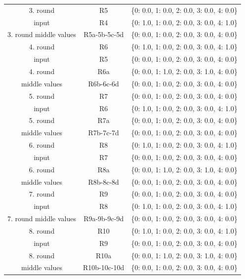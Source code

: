\documentclass [version=final]{iacrcc}
\begin{document}
\begin{table}[ht]
\begin{tabular}{|c|c|c|}
        \hline
        3. round  & R5 & \{0: 0.0, 1: 0.0, 2: 0.0, 3: 0.0, 4: 0.0\} \\
        input     & R4 & \{0: 1.0, 1: 0.0, 2: 0.0, 3: 0.0, 4: 1.0\} \\
        \hline
        3. round middle values     & R5a-5b-5c-5d & \{0: 0.0, 1: 0.0, 2: 0.0, 3: 0.0, 4: 0.0\} \\
        \hline
        4. round  & R6 & \{0: 1.0, 1: 0.0, 2: 0.0, 3: 0.0, 4: 1.0\} \\
        input     & R5 & \{0: 0.0, 1: 0.0, 2: 0.0, 3: 0.0, 4: 0.0\} \\
        \hline
        4. round  & R6a & \{0: 0.0, 1: 1.0, 2: 0.0, 3: 1.0, 4: 0.0\} \\
        middle values & R6b-6c-6d & \{0: 0.0, 1: 0.0, 2: 0.0, 3: 0.0, 4: 0.0\} \\
                              \hline
        5. round  & R7 & \{0: 0.0, 1: 0.0, 2: 0.0, 3: 0.0, 4: 0.0\} \\
        input     & R6 & \{0: 1.0, 1: 0.0, 2: 0.0, 3: 0.0, 4: 1.0\} \\
        \hline
        5. round  & R7a & \{0: 0.0, 1: 0.0, 2: 0.0, 3: 0.0, 4: 0.0\} \\
        middle values & R7b-7c-7d & \{0: 0.0, 1: 0.0, 2: 0.0, 3: 0.0, 4: 0.0\} \\
                      
        \hline
        6. round  & R8 & \{0: 1.0, 1: 0.0, 2: 0.0, 3: 0.0, 4: 1.0\} \\
        input     & R7 & \{0: 0.0, 1: 0.0, 2: 0.0, 3: 0.0, 4: 0.0\} \\
        \hline
        6. round  & R8a & \{0: 0.0, 1: 1.0, 2: 0.0, 3: 1.0, 4: 0.0\} \\
        middle values & R8b-8c-8d & \{0: 0.0, 1: 0.0, 2: 0.0, 3: 0.0, 4: 0.0\} \\
                     
        \hline
        7. round  & R9 & \{0: 0.0, 1: 0.0, 2: 0.0, 3: 0.0, 4: 0.0\} \\
        input     & R8 & \{0: 1.0, 1: 0.0, 2: 0.0, 3: 0.0, 4: 1.0\} \\
        \hline
        7. round middle values & R9a-9b-9c-9d & \{0: 0.0, 1: 0.0, 2: 0.0, 3: 0.0, 4: 0.0\} \\
        \hline
        8. round  & R10 & \{0: 1.0, 1: 0.0, 2: 0.0, 3: 0.0, 4: 1.0\} \\
        input      & R9  & \{0: 0.0, 1: 0.0, 2: 0.0, 3: 0.0, 4: 0.0\} \\
        \hline
        8. round  & R10a & \{0: 0.0, 1: 1.0, 2: 0.0, 3: 1.0, 4: 0.0\} \\
        middle values & R10b-10c-10d & \{0: 0.0, 1: 0.0, 2: 0.0, 3: 0.0, 4: 0.0\} \\
                      

\end{tabular}
\end{table}
\end{document}
